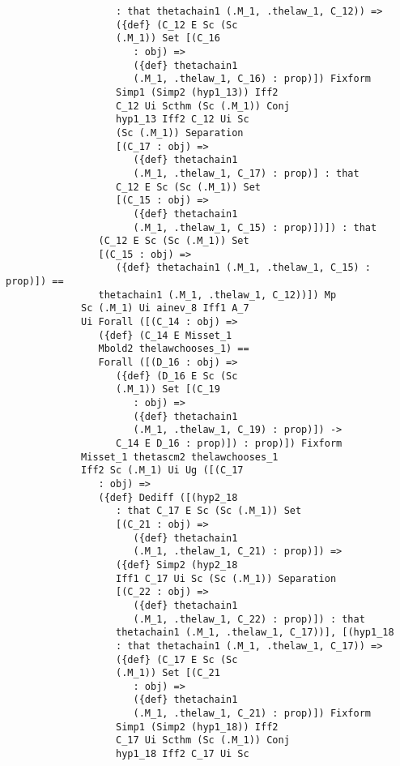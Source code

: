 \documentclass[12pt]{article}
\begin{document}
\begin{verbatim}
                   : that thetachain1 (.M_1, .thelaw_1, C_12)) => 
                   ({def} (C_12 E Sc (Sc 
                   (.M_1)) Set [(C_16 
                      : obj) => 
                      ({def} thetachain1 
                      (.M_1, .thelaw_1, C_16) : prop)]) Fixform 
                   Simp1 (Simp2 (hyp1_13)) Iff2 
                   C_12 Ui Scthm (Sc (.M_1)) Conj 
                   hyp1_13 Iff2 C_12 Ui Sc 
                   (Sc (.M_1)) Separation 
                   [(C_17 : obj) => 
                      ({def} thetachain1 
                      (.M_1, .thelaw_1, C_17) : prop)] : that 
                   C_12 E Sc (Sc (.M_1)) Set 
                   [(C_15 : obj) => 
                      ({def} thetachain1 
                      (.M_1, .thelaw_1, C_15) : prop)])]) : that 
                (C_12 E Sc (Sc (.M_1)) Set 
                [(C_15 : obj) => 
                   ({def} thetachain1 (.M_1, .thelaw_1, C_15) : prop)]) == 
                thetachain1 (.M_1, .thelaw_1, C_12))]) Mp 
             Sc (.M_1) Ui ainev_8 Iff1 A_7 
             Ui Forall ([(C_14 : obj) => 
                ({def} (C_14 E Misset_1 
                Mbold2 thelawchooses_1) == 
                Forall ([(D_16 : obj) => 
                   ({def} (D_16 E Sc (Sc 
                   (.M_1)) Set [(C_19 
                      : obj) => 
                      ({def} thetachain1 
                      (.M_1, .thelaw_1, C_19) : prop)]) -> 
                   C_14 E D_16 : prop)]) : prop)]) Fixform 
             Misset_1 thetascm2 thelawchooses_1 
             Iff2 Sc (.M_1) Ui Ug ([(C_17 
                : obj) => 
                ({def} Dediff ([(hyp2_18 
                   : that C_17 E Sc (Sc (.M_1)) Set 
                   [(C_21 : obj) => 
                      ({def} thetachain1 
                      (.M_1, .thelaw_1, C_21) : prop)]) => 
                   ({def} Simp2 (hyp2_18 
                   Iff1 C_17 Ui Sc (Sc (.M_1)) Separation 
                   [(C_22 : obj) => 
                      ({def} thetachain1 
                      (.M_1, .thelaw_1, C_22) : prop)]) : that 
                   thetachain1 (.M_1, .thelaw_1, C_17))], [(hyp1_18 
                   : that thetachain1 (.M_1, .thelaw_1, C_17)) => 
                   ({def} (C_17 E Sc (Sc 
                   (.M_1)) Set [(C_21 
                      : obj) => 
                      ({def} thetachain1 
                      (.M_1, .thelaw_1, C_21) : prop)]) Fixform 
                   Simp1 (Simp2 (hyp1_18)) Iff2 
                   C_17 Ui Scthm (Sc (.M_1)) Conj 
                   hyp1_18 Iff2 C_17 Ui Sc 

\end{verbatim}
\end{document}
